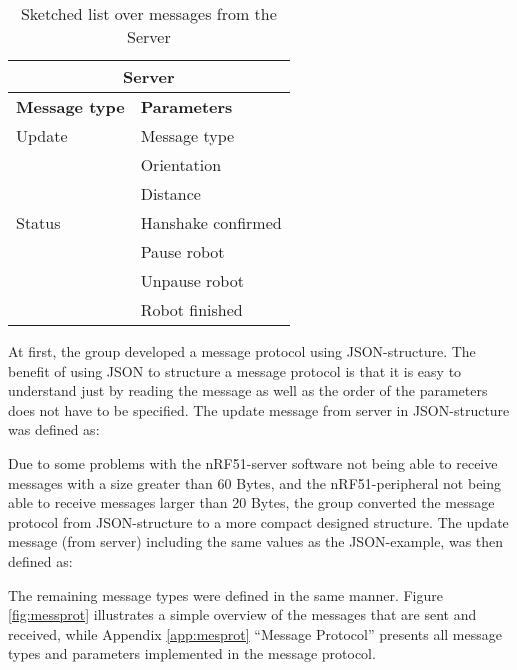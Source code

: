 \begin{table}[ht]
\begin{center}
 \begin{tabular}{|p{60pt} | p{150pt}|} 
 \hline
 \multicolumn{2}{|c|}{\textbf{Server}}\\
 \hline
 \hline
 \textbf{Message type}       &    \textbf{Parameters} \\
 \hline

 Update              &   Message type \\
                    &   Orientation \\
                    &   Distance \\
 \hline
 Status                &   Hanshake confirmed \\
                    &   Pause robot \\
                    &   Unpause robot \\
                    &   Robot finished \\
 \hline
\end{tabular}
\end{center}
\caption{Sketched list over messages from the Server}
\label{tab:messprotfromser}
\end{table}

At first, the group developed a message protocol using JSON-structure. The benefit of using JSON to structure a message protocol is that it is easy to understand just by reading the message as well as the order of the parameters does not have to be specified. The update message from server in JSON-structure was defined as:


Due to some problems with the nRF51-server software not being able to receive messages with a size greater than 60 Bytes, and the nRF51-peripheral not being able to receive messages larger than 20 Bytes, the group converted the message protocol from JSON-structure to a more compact designed structure. The update message (from server) including the same values as the JSON-example, was then defined as:


The remaining message types were defined in the same manner. Figure \ref{fig:messprot} illustrates a simple overview of the messages that are sent and received, while Appendix \ref{app:mesprot} ``Message Protocol'' presents all message types and parameters implemented in the message protocol.

